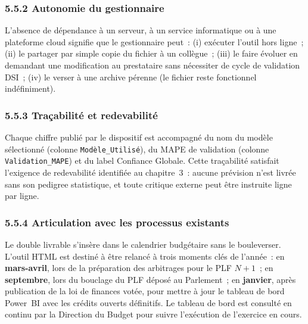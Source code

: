 \subsubsection*{5.5.2 \quad Autonomie du gestionnaire}

L'absence de d\'ependance \`a un serveur, \`a un service informatique ou
\`a une plateforme cloud signifie que le gestionnaire peut~: (i) ex\'ecuter
l'outil hors ligne~; (ii) le partager par simple copie du fichier \`a un
coll\`egue~; (iii) le faire \'evoluer en demandant une modification au
prestataire sans n\'ecessiter de cycle de validation DSI~; (iv) le verser
\`a une archive p\'erenne (le fichier reste fonctionnel ind\'efiniment).

\subsubsection*{5.5.3 \quad Tra\c{c}abilit\'e et redevabilit\'e}

Chaque chiffre publi\'e par le dispositif est accompagn\'e du nom du
mod\`ele s\'electionn\'e (colonne \texttt{Mod\`ele\_Utilis\'e}), du MAPE de
validation (colonne \texttt{Validation\_MAPE}) et du label Confiance
Globale. Cette tra\c{c}abilit\'e satisfait l'exigence de redevabilit\'e
identifi\'ee au chapitre~3~: aucune
pr\'evision n'est livr\'ee sans son \og pedigree \fg{} statistique, et
toute critique externe peut \^etre instruite ligne par ligne.

\subsubsection*{5.5.4 \quad Articulation avec les processus existants}

Le double livrable s'ins\`ere dans le calendrier budg\'etaire sans le
bouleverser. L'outil HTML est destin\'e \`a \^etre relanc\'e \`a trois
moments cl\'es de l'ann\'ee~: en \textbf{mars-avril}, lors de la
pr\'eparation des arbitrages pour le PLF $N+1$~; en \textbf{septembre}, lors
du bouclage du PLF d\'epos\'e au Parlement~; en \textbf{janvier}, apr\`es
publication de la loi de finances vot\'ee, pour mettre \`a jour le tableau
de bord Power~BI avec les cr\'edits ouverts d\'efinitifs. Le tableau de
bord est consult\'e en continu par la Direction du Budget pour suivre
l'ex\'ecution de l'exercice en cours.

